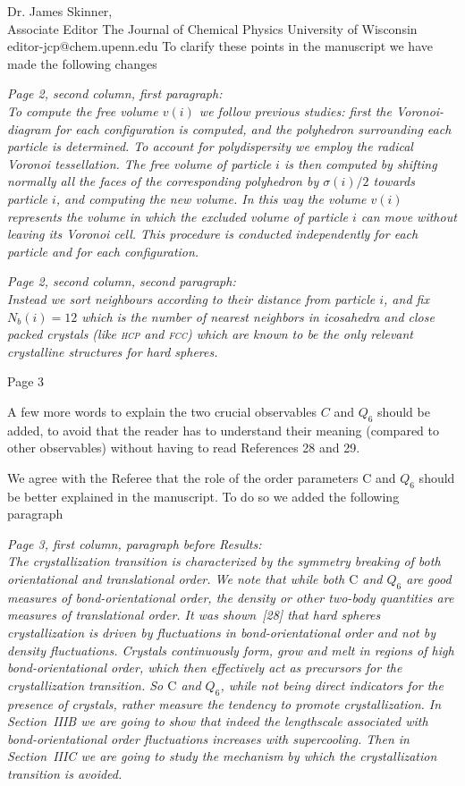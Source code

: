 \documentclass[a4paper, rebuttal, parskip=true, firsthead=false, fromemail=false, foldmarks=false]{scrlttr2}
\begin{document}
\begin{letter}{Dr. James Skinner,\\Associate Editor
The Journal of Chemical Physics
University of Wisconsin\\
editor-jcp@chem.upenn.edu }
To clarify these points in the manuscript we have made the following changes

{\it Page 2, second column, first paragraph:\\
To compute the free volume $v(i)$ we follow previous
studies: first the Voronoi-diagram for each configuration is computed, and the polyhedron
surrounding each particle is determined. To account for polydispersity we employ the radical Voronoi tessellation.
The free volume of particle $i$ is then
computed by shifting normally all the faces of the corresponding polyhedron by $\sigma(i)/2$
towards particle $i$, and computing the new volume. In this way
the volume $v(i)$ represents the volume in which the excluded volume of particle $i$ can move without leaving its Voronoi cell.
This procedure is conducted independently
for each particle and for each configuration.
}

{\it Page 2, second column, second paragraph:\\
Instead we
sort neighbours according to their distance from particle $i$, and
fix $N_b(i)=12$ which is the number of nearest neighbors in icosahedra and close packed crystals (like \textsc{hcp} and \textsc{fcc})
which are known to be the only relevant crystalline structures for hard spheres.
}


\begin{quotationi}
Page 3

A few more words to explain the two crucial observables $C$ and $Q_6$ should be added, to avoid that the reader has to understand their meaning (compared to other observables) without having to read References 28 and 29.
\end{quotationi}

We agree with the Referee that the role of the order parameters $\text{C}$ and $Q_6$ should be better explained in the manuscript. To do so we added the following
paragraph

{\it Page 3, first column, paragraph before Results:\\
The crystallization transition is characterized by
the symmetry breaking of both orientational and translational order.
We note that while both $\text{C}$ and $Q_6$ are good measures of bond-orientational order, the density or other two-body
quantities are measures of translational order.  It was shown~[28] that hard spheres crystallization is
driven by fluctuations in bond-orientational order and not by density fluctuations. Crystals continuously form, grow and melt
in regions of high bond-orientational order, which then effectively act as precursors for the crystallization transition.
So $\text{C}$ and $Q_6$, while not
being direct indicators for the presence of crystals, rather measure the tendency to promote crystallization. In Section~IIIB we are going to show
that indeed the lengthscale associated with bond-orientational order fluctuations increases with supercooling. Then in Section~IIIC we are going to study
the mechanism by which the crystallization transition is avoided.
}


\end{letter}
\end{document}
